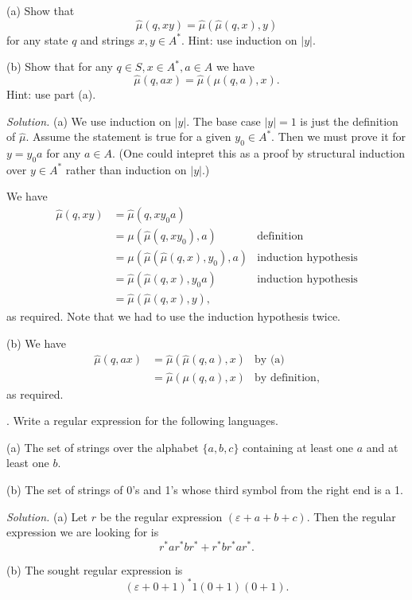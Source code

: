 \documentclass[10pt,a4paper,reqno]{amsart}
\begin{document}
(a) Show that $$\widehat{\mu}(q,xy) = \widehat{\mu}(\widehat{\mu}(q,x),y)$$ for
any state $q$ and strings $x,y\in A^*$. Hint: use induction on $|y|$.

(b) Show that for any $q\in S, x\in A^*, a\in A$ we have \[\widehat{\mu}(q,ax)
= \widehat{\mu}(\mu(q,a),x).\] Hint: use part (a).

\bigskip

\emph{Solution.} (a) We use induction on $|y|$. The base case $|y|=1$ is just
the definition of $\widehat{\mu}$. Assume the statement is true for a given
$y_0\in A^*.$ Then we must prove it for $y = y_0a$ for any $a\in A$. (One could
intepret this as a proof by structural induction over $y\in A^*$ rather than
induction on $|y|$.)

We have \begin{align*}
\widehat{\mu}(q,xy) &= \widehat{\mu}(q,xy_0a)\\
&= \mu(\widehat{\mu}(q,xy_0),a) & \text{definition}\\
&= \mu(\widehat{\mu}(\widehat{\mu}(q,x),y_0),a) & \text{induction hypothesis} \\
&= \widehat{\mu}(\widehat{\mu}(q,x),y_0a) & \text{induction hypothesis}\\
&= \widehat{\mu}(\widehat{\mu}(q,x),y),
\end{align*}
as required. Note that we had to use the induction hypothesis twice.

(b) We have
\begin{align*}
    \widehat{\mu}(q,ax) &= \widehat{\mu}(\widehat{\mu}(q,a),x) & \text{by (a)}\\
    &= \widehat{\mu}(\mu(q,a),x) & \text{by definition},
\end{align*} as required.

\bigskip

. Write a regular expression for the following languages.

(a) The set of strings over the alphabet \(\{a,b,c\}\) containing at least one
$a$ and at least one $b$.

(b) The set of strings of 0's and 1's whose third symbol from the right end is
a 1.

\bigskip

\emph{Solution.} (a) Let $r$ be the regular expression $(\varepsilon+a+b+c)$.
Then the regular expression we are looking for is $$r^* a r^* b r^* + r^* b r^*
a r^*.$$

(b) The sought regular expression is \[(\varepsilon+0+1)^*1(0+1)(0+1).\]
\bigskip
\end{document}
